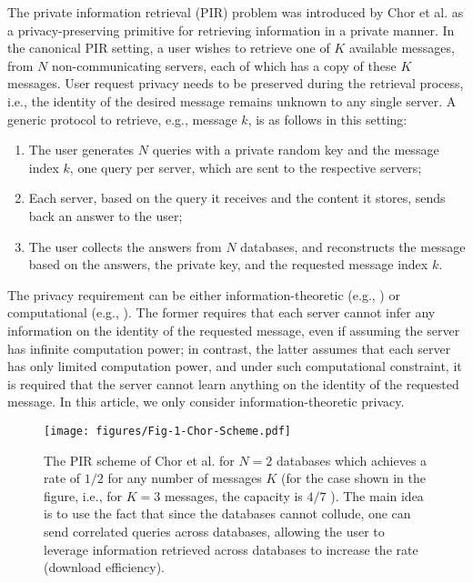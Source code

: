 
The private information retrieval (PIR) problem was introduced by Chor et al. \cite{PIRfirst} as a privacy-preserving primitive for retrieving information in a private manner. In the canonical PIR setting, a user wishes to retrieve one of $K$ available messages, from $N$ non-communicating servers, each of which has a copy of these $K$ messages. User request privacy needs to be preserved during the retrieval process, i.e., the identity of the desired message remains unknown to any single server. A generic protocol to retrieve, e.g., message $k$, is as follows in this setting:
\begin{enumerate}
\item The user generates $N$ queries with a private random key and the message index $k$, one query per server, which are sent to the respective servers;
\item Each server, based on the query it receives and the content it stores, sends back an answer to the user;
\item The user collects the answers from $N$ databases, and reconstructs the message based on the answers, the private key, and the requested message index $k$.
\end{enumerate}

The privacy requirement can be either information-theoretic (e.g., \cite{Beimel_Ishai}) or computational (e.g., \cite{CPIR_log}). The former requires that each server cannot infer any information on the identity of the requested message, even if assuming the server has infinite computation power; in contrast, the latter assumes that each server has only limited computation power, and under such computational constraint, it is required that the server cannot learn anything on the identity of the requested message. In this article, we only consider information-theoretic privacy.

\begin{figure}[t]
\centering
\vspace{0.2cm}
\texttt{[image: figures/Fig-1-Chor-Scheme.pdf]}
\caption{The PIR scheme of Chor et al. \cite{PIRfirst} for $N=2$ databases which achieves a rate of $1/2$ for any number of messages $K$ (for the case shown in the figure, i.e., for $K=3$ messages, the capacity is $4/7$ \cite{sun2017PIRcapacity}). The main idea is to use the fact that since the databases cannot collude, one can send correlated queries across databases, allowing the user to leverage information retrieved across databases to increase the rate (download efficiency).  \label{fig:Chor-scheme} }
\end{figure}

